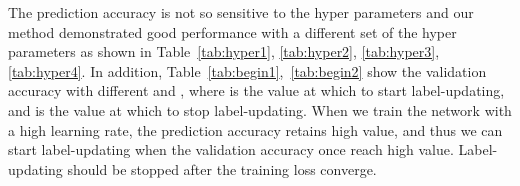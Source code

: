 \documentclass[10pt,twocolumn,letterpaper]{article}
\newcommand{\Tref}[1]{Table~\ref{#1}}
\begin{document}
The prediction accuracy is not so sensitive to the hyper parameters and our method demonstrated good performance with a different set of the hyper parameters as shown in \Tref{tab:hyper1}, \ref{tab:hyper2}, \ref{tab:hyper3}, \ref{tab:hyper4}.
In addition, \Tref{tab:begin1},~\ref{tab:begin2} show the validation accuracy with different  and , where  is the value at which to start label-updating, and  is the value at which to stop label-updating.
When we train the network with a high learning rate, the prediction accuracy retains high value, and thus we can start label-updating when the validation accuracy once reach high value. Label-updating should be stopped after the training loss converge.

\begin{table}[b]
  \vspace{-5pt}
  \caption{Validation accuracy with different hyper parameters in the triple test (experimented on AN-CIFAR with noise rate ).}
  \centering
  \label{tab:hyper1}
\end{table}
\end{document}
